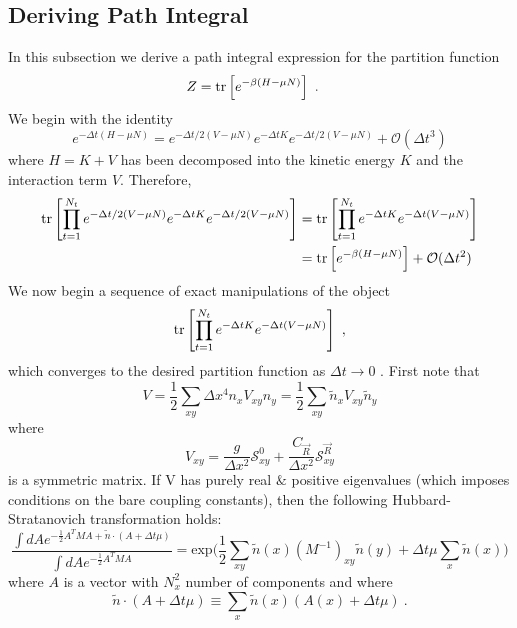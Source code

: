 \subsection{Deriving Path Integral}
In this subsection we derive a path integral expression for the partition function
\begin{align}
	Z
	&=
	\text{tr}\left[e^{-\beta(H-\mu N)}\right]~.
\end{align}
We begin with the identity
\begin{equation}
e^{-\Delta t(H - \mu N)} = e^{-\Delta t/2(V - \mu N)}  e^{-\Delta t K}  e^{-\Delta t/2(V - \mu N)} + \mathcal{O}(\Delta t^3) 
\end{equation}
where $H = K + V$ has been decomposed into the kinetic energy $K$ and the interaction term $V$. Therefore,
\begin{align}
\text{tr}\left[\prod_{t=1}^{N_t} e^{-\Delta t/2(V - \mu N)}  e^{-\Delta t K}  e^{-\Delta t/2(V - \mu N)}\right] & =
\text{tr}\left[\prod_{t=1}^{N_t} e^{-\Delta t K }  e^{-\Delta t (V -\mu N)}  \right] \\
& =  \text{tr}\left[e^{-\beta(H-\mu N)}\right] + \mathcal{O}(\Delta t^2)
\end{align}
We now begin a sequence of exact manipulations of the object 
\begin{equation}
\text{tr}\left[\prod_{t=1}^{N_t} e^{-\Delta t K }  e^{-\Delta t (V -\mu N)}  \right]~,
\end{equation}
which converges to the desired partition function as $\Delta t \rightarrow 0$ . First note that
\begin{equation}
V =  \frac{1}{2} \sum_{xy} \Delta x^4 n_x V_{xy} n_y = \frac{1}{2} \sum_{xy} \tilde{n}_x V_{xy} \tilde{n}_y 
\end{equation}
where 
\begin{equation}
V_{xy} = \frac{g}{\Delta x^2} \mathcal{S}^0_{x y} + \frac{C_{ \vec{R} }}{\Delta x^2} \mathcal{S}^{ \vec{R} }_{xy}
\end{equation}
is a symmetric matrix. If V has purely real $\&$ positive eigenvalues (which imposes conditions on the bare coupling constants), then the following Hubbard-Stratanovich transformation holds:
\begin{equation}
\frac{\int d {A} e^{-\frac{1}{2} {A}^T M A + \tilde{n} \cdot (A+\Delta t \mu) } }{ \int d {A} e^{-\frac{1}{2} {A}^T M A  } }
=
\text{exp}\Bigg( \frac{1}{2} \sum_{x y}\tilde{n}(x) (M^{-1})_{xy} \tilde{n}(y) + \Delta t \mu \sum_x \tilde{n}(x) \Bigg) 
\end{equation}
where $A$ is a vector with $N_x^2$ number of components and where
\begin{equation}
\tilde{n}\cdot (A + \Delta t \mu) \equiv \sum_x \tilde{n}(x) ( A(x) +\Delta t \mu)~.
\end{equation}
